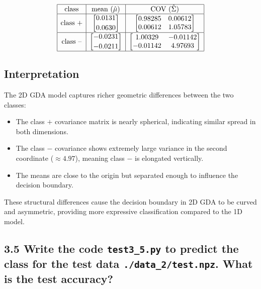 \documentclass[12pt]{article}
\begin{document}
\[
\begin{array}{|c|c|c|}
\hline
\text{class} & \text{mean }(\hat{\mu}) & \text{COV }(\hat{\Sigma}) \\
\hline
\text{class +} &
\begin{bmatrix}
0.0131 \\[2pt]
0.0630
\end{bmatrix}
&
\begin{bmatrix}
0.98285 & 0.00612 \\
0.00612 & 1.05783
\end{bmatrix}
\\
\hline
\text{class --} &
\begin{bmatrix}
-0.0231 \\[2pt]
-0.0211
\end{bmatrix}
&
\begin{bmatrix}
1.00329 & -0.01142 \\
-0.01142 & 4.97693
\end{bmatrix}
\\
\hline
\end{array}
\]

\subsection*{Interpretation}
The 2D GDA model captures richer geometric differences between the two classes:

\begin{itemize}
    \item The class $+$ covariance matrix is nearly spherical, indicating similar spread in both dimensions.
    \item The class $-$ covariance shows extremely large variance in the second coordinate 
          ($\approx 4.97$), meaning class $-$ is elongated vertically.
    \item The means are close to the origin but separated enough to influence the decision boundary.
\end{itemize}

These structural differences cause the decision boundary in 2D GDA to be curved and asymmetric,
providing more expressive classification compared to the 1D model.


\subsection*{3.5
Write the code \texttt{test3\_5.py} to predict the class for the test data \texttt{./data\_2/test.npz}. What is the test accuracy?}
\end{document}
